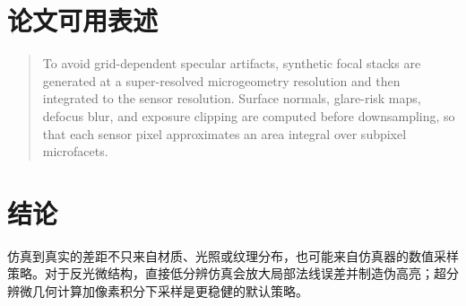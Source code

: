 \documentclass[11pt,a4paper]{ctexart}
\begin{document}
\section{论文可用表述}

\begin{quote}
To avoid grid-dependent specular artifacts, synthetic focal stacks are generated at a super-resolved microgeometry resolution and then integrated to the sensor resolution. Surface normals, glare-risk maps, defocus blur, and exposure clipping are computed before downsampling, so that each sensor pixel approximates an area integral over subpixel microfacets.
\end{quote}

\section{结论}

仿真到真实的差距不只来自材质、光照或纹理分布，也可能来自仿真器的数值采样策略。对于反光微结构，直接低分辨仿真会放大局部法线误差并制造伪高亮；超分辨微几何计算加像素积分下采样是更稳健的默认策略。
\end{document}
